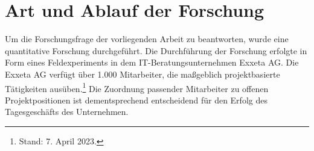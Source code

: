 

\section{Art und Ablauf der Forschung}
Um die Forschungsfrage der vorliegenden Arbeit zu beantworten, wurde eine quantitative Forschung durchgeführt.
Die Durchführung der Forschung erfolgte in Form eines Feldexperiments in dem IT-Beratungsunternehmen Exxeta AG.
Die Exxeta AG verfügt über 1.000 Mitarbeiter, die maßgeblich projektbasierte Tätigkeiten ausüben.\footnote{Stand: 7. April 2023.}
Die Zuordnung passender Mitarbeiter zu offenen Projektpositionen ist dementsprechend entscheidend für den Erfolg des Tagesgeschäfts des Unternehmen.

